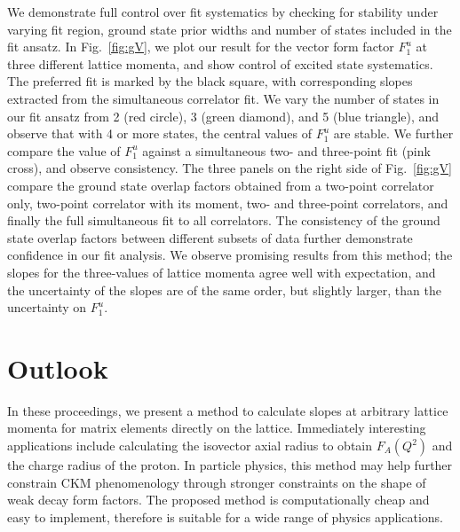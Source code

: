 \documentclass{PoS}
\begin{document}
We demonstrate full control over fit systematics by checking for stability under varying fit region, ground state prior widths and number of states included in the fit ansatz. In Fig.~\ref{fig:gV}, we plot our result for the vector form factor $F^u_1$ at three different lattice momenta, and show control of excited state systematics.  The preferred fit is marked by the black square, with corresponding slopes extracted from the simultaneous correlator fit. We vary the number of states in our fit ansatz from 2 (red circle), 3 (green diamond), and 5 (blue triangle), and observe that with 4 or more states, the central values of $F_1^u$ are stable. We further compare the value of $F_1^u$ against a simultaneous two- and three-point fit (pink cross), and observe consistency. The three panels on the right side of Fig.~\ref{fig:gV} compare the ground state overlap factors obtained from a two-point correlator only, two-point correlator with its moment, two- and three-point correlators, and finally the full simultaneous fit to all correlators.  The consistency of the ground state overlap factors between different subsets of data further demonstrate confidence in our fit analysis. We observe promising results from this method; the slopes for the three-values of lattice momenta agree well with expectation, and the uncertainty of the slopes are of the same order, but slightly larger, than the uncertainty on $F_1^u$.

\section{Outlook}
In these proceedings, we present a method to calculate slopes at arbitrary lattice momenta for matrix elements directly on the lattice.  Immediately interesting applications include calculating the isovector axial radius to obtain $F_A(Q^2)$ and the charge radius of the proton.  In particle physics, this method may help further constrain CKM phenomenology through stronger constraints on the shape of weak decay form factors. The proposed method is computationally cheap and  easy to implement, therefore is suitable for a wide range of physics applications.

\end{document}
